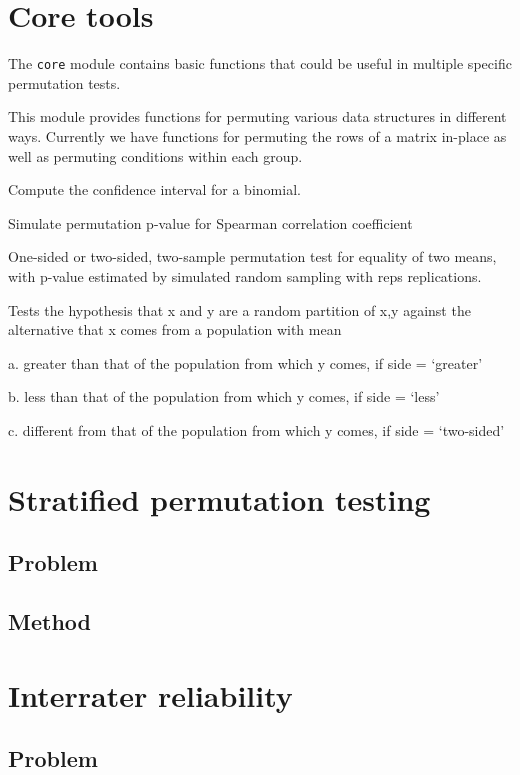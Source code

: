 \section{Core tools}

The \texttt{core} module contains basic functions that could be useful in
multiple specific permutation tests.  

This module provides functions for permuting various data structures in
different ways.  Currently we have functions for permuting the rows of
a matrix in-place as well as permuting conditions within each group.


Compute the confidence interval for a binomial.


Simulate permutation p-value for Spearman correlation coefficient


One-sided or two-sided, two-sample permutation test for equality of two means,
with p-value estimated by simulated random sampling with reps replications.

Tests the hypothesis that x and y are a random partition of x,y against the
alternative that x comes from a population with mean

a. greater than that of the population from which y comes, if side = ‘greater’

b. less than that of the population from which y comes, if side = ‘less’

c. different from that of the population from which y comes, if side = ‘two-sided’

\section{Stratified permutation testing}

\subsection{Problem}

\subsection{Method}

\section{\label{sec:irr}Interrater reliability}

\subsection{Problem}


